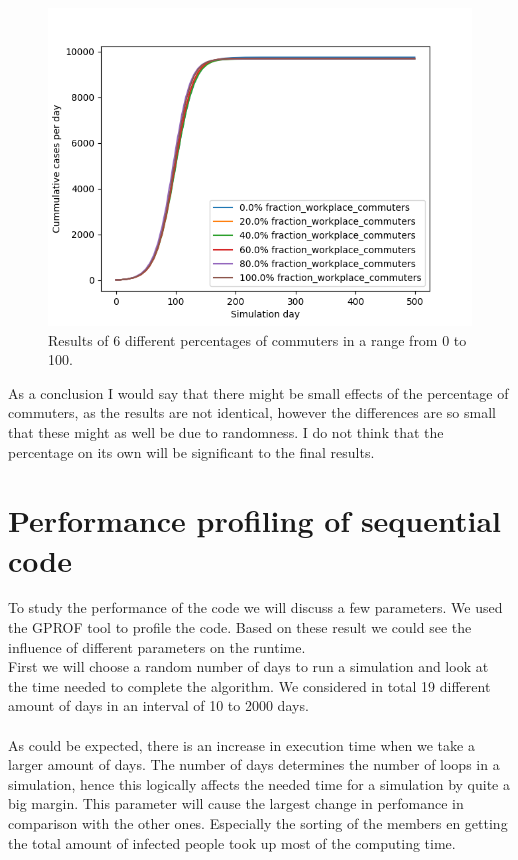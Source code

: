 \documentclass[runningheads]{llncs}
\begin{document}
	\begin{figure}
		\includegraphics[width=\textwidth]{commuting_cumul.png}
		\caption{Results of 6 different percentages of commuters in a range from 0 to 100.}
	\end{figure}

	\noindent
	As a conclusion I would say that there might be small effects of the percentage of commuters, as the results are not identical, however the differences are so small that these might as well be due to randomness. I do not think that the percentage on its own will be significant to the final results.
	
	
	\section{Performance profiling of sequential code}
	To study the performance of the code we will discuss a few parameters. We used the GPROF tool to profile the code. Based on these result we could see the influence of different parameters on the runtime.
	\\
	First we will choose a random number of days to run a simulation and look at the time needed to complete the algorithm. We considered in total 19 different amount of days in an interval of 10 to 2000 days. \\ 
	\\
	As could be expected, there is an increase in execution time when we take a larger amount of days. The number of days determines the number of loops in a simulation, hence this logically affects the needed time for a simulation by quite a big margin. This parameter will cause the largest change in perfomance in comparison with the other ones. Especially the sorting of the members en getting the total amount of infected people took up most of the computing time.
	
\end{document}
